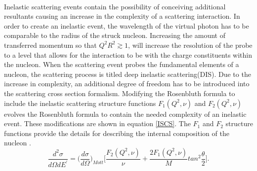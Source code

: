 \paragraph{}Inelastic scattering events contain the possibility of conceiving additional resultants causing an increase in the complexity of a scattering interaction. In order to create an inelastic event, the wavelength of the virtual photon has to be comparable to the radius of the struck nucleon. Increasing the amount of transferred momentum so that $Q^2R^2 \gtrsim 1$, will increase the resolution of the probe to a level that allows for the interaction to be with the charge constituents within the nucleon. When the scattering event probes the fundamental elements of a nucleon, the scattering process is titled deep inelastic scattering(DIS). Due to the increase in complexity, an additional degree of freedom has to be introduced into the scattering cross section formalism. Modifying the Rosenbluth formula to include the inelastic scattering structure functions $F_1(Q^2,\nu)$ and $F_2(Q^2,\nu)$ evolves the Rosenbluth formula to contain the needed complexity of an inelastic event. These modifications are shown in equation \ref{ISCS}. The $F_1$ and $F_2$ structure functions provide the details for describing the internal composition of the nucleon \cite{PnN}. 
\begin{equation}
\label{ISCS}
\frac{d^2\sigma}{d\Omega dE^\prime}=\bigg(\frac{d\sigma}{d\Omega}\bigg)_{Mott} \bigg\lbrack \frac{F_2(Q^2,\nu)}{\nu} + \frac{2F_1(Q^2,\nu)}{M}tan^2\frac{\theta}{2} \bigg \rbrack.
\end{equation}  
